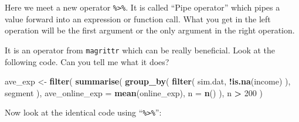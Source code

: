 \documentclass[12pt,]{krantz}
\makeatletter
\newenvironment{Shaded}{\begin{snugshade}}{\end{snugshade}}
\newcommand{\DataTypeTok}[1]{\textcolor[rgb]{0.27,0.27,0.27}{#1}}
\newcommand{\DecValTok}[1]{\textcolor[rgb]{0.06,0.06,0.06}{#1}}
\newcommand{\KeywordTok}[1]{\textcolor[rgb]{0.27,0.27,0.27}{\textbf{#1}}}
\newcommand{\NormalTok}[1]{#1}
\newcommand{\OperatorTok}[1]{\textcolor[rgb]{0.43,0.43,0.43}{\textbf{#1}}}
\newcommand{\StringTok}[1]{\textcolor[rgb]{0.5,0.5,0.5}{#1}}
\newenvironment{kframe}{%
\medskip{}
\setlength{\fboxsep}{.8em}
 \def\at@end@of@kframe{}%
 \ifinner\ifhmode%
  \def\at@end@of@kframe{\end{minipage}}%
  \begin{minipage}{\columnwidth}%
 \fi\fi%
 \def\FrameCommand##1{\hskip\@totalleftmargin \hskip-\fboxsep
 \colorbox{shadecolor}{##1}\hskip-\fboxsep
     \hskip-\linewidth \hskip-\@totalleftmargin \hskip\columnwidth}%
 \MakeFramed {\advance\hsize-\width
   \@totalleftmargin\z@ \linewidth\hsize
   \@setminipage}}%
 {\par\unskip\endMakeFramed%
 \at@end@of@kframe}
\renewenvironment{Shaded}{\begin{kframe}}{\end{kframe}}
\makeatother
\begin{document}
\begin{Shaded}
\end{Shaded}

Here we meet a new operator \texttt{\%\textgreater{}\%}. It is called ``Pipe operator'' which pipes a value forward into an expression or function call. What you get in the left operation will be the first argument or the only argument in the right operation.

\begin{Shaded}
\end{Shaded}

It is an operator from \texttt{magrittr} which can be really beneficial. Look at the following code. Can you tell me what it does?

\begin{Shaded}
\begin{Highlighting}[]
\NormalTok{ave_exp <-}\StringTok{ }\KeywordTok{filter}\NormalTok{( }
  \KeywordTok{summarise}\NormalTok{(}
    \KeywordTok{group_by}\NormalTok{( }
      \KeywordTok{filter}\NormalTok{(}
\NormalTok{        sim.dat, }
        \OperatorTok{!}\KeywordTok{is.na}\NormalTok{(income)}
\NormalTok{      ), }
\NormalTok{      segment}
\NormalTok{    ), }
    \DataTypeTok{ave_online_exp =} \KeywordTok{mean}\NormalTok{(online_exp), }
    \DataTypeTok{n =} \KeywordTok{n}\NormalTok{()}
\NormalTok{  ), }
\NormalTok{  n }\OperatorTok{>}\StringTok{ }\DecValTok{200}
\NormalTok{) }
\end{Highlighting}
\end{Shaded}

Now look at the identical code using ``\texttt{\%\textgreater{}\%}'':

\begin{Shaded}
\end{Shaded}
\end{document}
